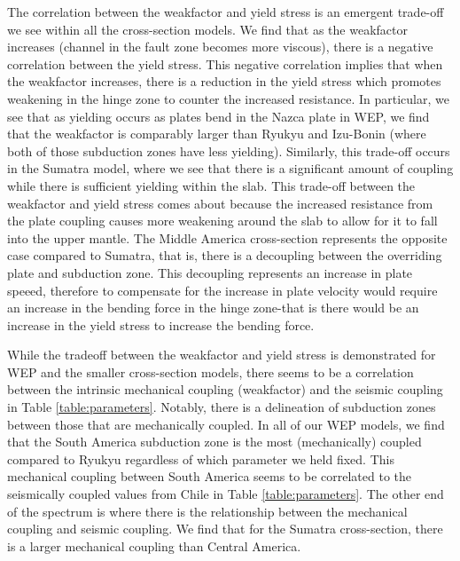 \documentclass[12pt]{article}
\begin{document}
  The correlation between the weakfactor and yield stress is an emergent trade-off we see within all the cross-section models. We find that as the weakfactor increases (channel in the fault zone becomes more viscous), there is a negative correlation between the yield stress. This negative correlation implies that when the weakfactor increases, there is a reduction in the yield stress which promotes weakening in the hinge zone to counter the increased resistance. In particular, we see that as yielding occurs as plates bend in the Nazca plate in WEP, we find that the weakfactor is comparably larger than Ryukyu and Izu-Bonin (where both of those subduction zones have less yielding). Similarly, this trade-off occurs in the Sumatra model, where we see that there is a significant amount of coupling while there is sufficient yielding within the slab. This trade-off between the weakfactor and yield stress comes about because the increased resistance from the plate coupling causes more weakening around the slab to allow for it to fall into the upper mantle.  The Middle America cross-section represents the opposite case compared to Sumatra, that is, there is a decoupling between the overriding plate and subduction zone. This decoupling represents an increase in plate speeed, therefore to compensate for the increase in plate velocity would require an increase in the bending force in the hinge zone-that is there would be an increase in the yield stress to increase the bending force.
  
   While the tradeoff between the weakfactor and yield stress is demonstrated for WEP and the smaller cross-section models, there seems to be a correlation between the intrinsic mechanical coupling (weakfactor) and the seismic coupling in Table \ref{table:parameters}. Notably, there is a delineation of subduction zones between those that are mechanically coupled. In all of our WEP models, we find that the South America subduction zone is the most (mechanically) coupled compared to Ryukyu regardless of which parameter we held fixed. This mechanical coupling between South America seems to be correlated to the seismically coupled values from Chile in Table \ref{table:parameters}. The other end of the spectrum is where there is the relationship between the mechanical coupling and seismic coupling. We find that for the Sumatra cross-section, there is a larger mechanical coupling than Central America.
   
\end{document}
